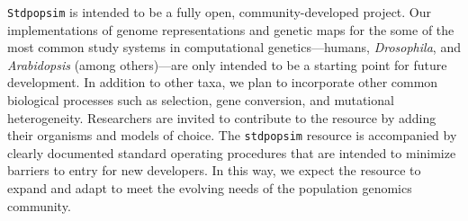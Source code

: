 \documentclass[12pt,halfline,a4paper]{ouparticle}
\newcommand{\Stdpopsim}{\texttt{Stdpopsim}\xspace}
\newcommand{\stdpopsim}{\texttt{stdpopsim}\xspace}
\newcommand{\dadi}{$\partial a \partial i$\xspace}
\newcommand{\MSMC}{\texttt{MSMC}\xspace}
\begin{document}
\Stdpopsim is intended to be a fully open, community-developed project.
Our implementations of genome representations and genetic maps for the some of
the most common study systems in computational genetics---humans, \textit{Drosophila},
and \textit{Arabidopsis} (among others)---are only intended to be a starting point for
future development.  In addition to other taxa,
we plan to incorporate other common biological processes
such as selection, gene conversion, and mutational heterogeneity.
Researchers are invited to contribute to the resource by adding their
organisms and models of choice. The \stdpopsim resource is
accompanied by clearly documented standard operating procedures that are
intended to minimize barriers to entry for new developers.  In this way, we
expect the resource to expand and adapt to meet the evolving needs of the
population genomics community.


\end{document}
